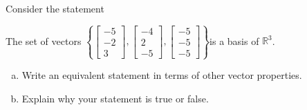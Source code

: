 
\begin{exerciseStatement}


Consider the statement 
\begin{center}\begin{minipage}{0.8\textwidth}
 The set of vectors \( \left\{ \left[\begin{array}{c}
-5 \\
-2 \\
3
\end{array}\right] , \left[\begin{array}{c}
-4 \\
2 \\
-5
\end{array}\right] , \left[\begin{array}{c}
-5 \\
-5 \\
-5
\end{array}\right] \right\} \)is a basis of \(\mathbb{R}^3\). 
\end{minipage}\end{center}
    


\begin{enumerate}[(a)]
\item  Write an equivalent statement in terms of other vector properties.
\item  Explain why your statement is true or false.
\end{enumerate}
    
\end{exerciseStatement}
    
